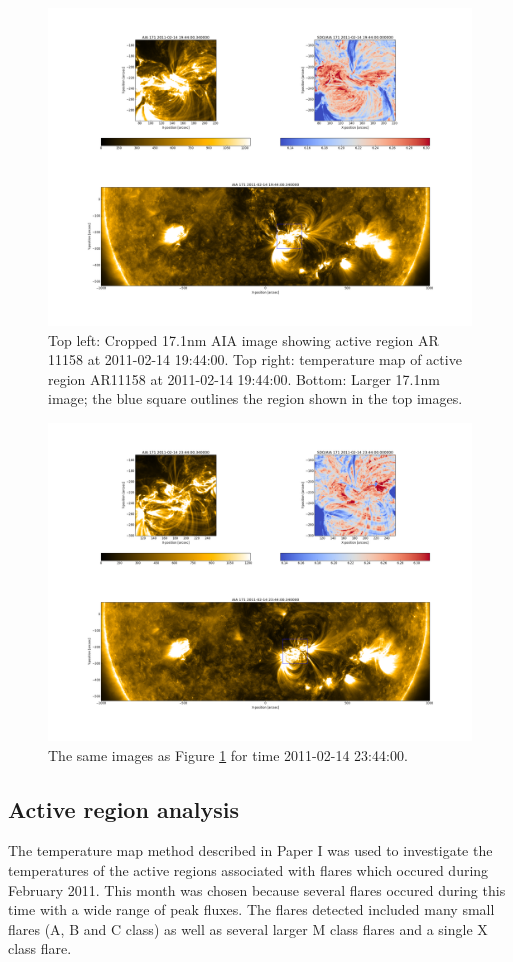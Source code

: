 \documentclass[referee,a4paper,12pt,traditabstract]{swsc}
\begin{document}
\begin{linenumbers}
\begin{figure}
	\centering
		\includegraphics[width=0.9\columnwidth]{20110214T194400with171.png}
	\caption{Top left: Cropped 17.1nm AIA image showing active region AR 11158 at 2011-02-14 19:44:00. Top right: temperature map of active region AR11158 at 2011-02-14 19:44:00. Bottom: Larger 17.1nm image; the blue square outlines the region shown in the top images.}
	\label{fig:trackdemo1}
\end{figure}
\begin{figure}
	\centering
		\includegraphics[width=0.9\columnwidth]{20110214T234400with171.png}
	\caption{The same images as Figure \ref{fig:trackdemo1} for time 2011-02-14 23:44:00.}
	\label{fig:trackdemo2}
\end{figure}

\subsection{Active region analysis}
The temperature map method described in Paper I was used to investigate the temperatures of the active regions associated with flares which occured during February 2011.
This month was chosen because several flares occured during this time with a wide range of peak fluxes.
The flares detected included many small flares (A, B and C class) as well as several larger M class flares and a single X class flare. %


\end{linenumbers}
\end{document}
